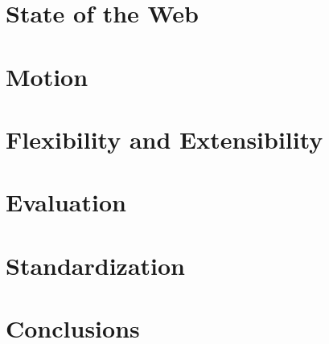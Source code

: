 \documentclass[graybox]{svmult}
\begin{document}
\section{State of the Web}
\label{sec:web}


\section{Motion}
\label{sec:motion}


\section{Flexibility and Extensibility}
\label{sec:flexibility}


\section{Evaluation}
\label{sec:eval}


\section{Standardization}
\label{sec:standard}


\section{Conclusions}
\label{sec:concl}


\newpage

 
\end{document}
